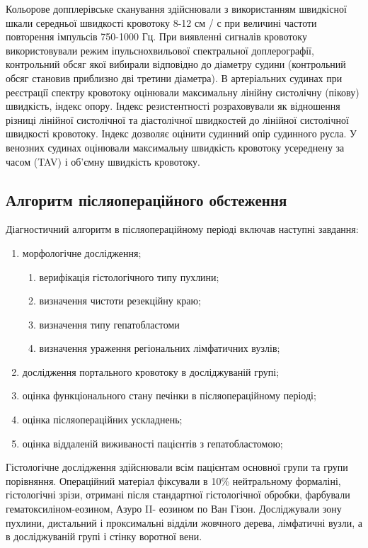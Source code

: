 Кольорове допплерівське сканування здійснювали з використанням швидкісної шкали середньої швидкості кровотоку 8-12 см / с при величині частоти повторення імпульсів 750-1000 Гц. При виявленні сигналів кровотоку використовували режим іпульснохвильової спектральної доплерографії, контрольний обсяг якої вибирали відповідно до діаметру судини (контрольний обсяг становив приблизно дві третини діаметра). В артеріальних судинах при реєстрації спектру кровотоку оцінювали максимальну лінійну систолічну (пікову) швидкість, індекс опору. Індекс резистентності розраховували як відношення різниці лінійної систолічної та діастолічної швидкостей до лінійної систолічної швидкості кровотоку. Індекс дозволяє оцінити судинний опір судинного русла. У венозних судинах оцінювали максимальну швидкість кровотоку усереднену за часом (TAV) і об'ємну швидкість кровотоку.

\subsection{Алгоритм післяопераційного обстеження}

Діагностичний алгоритм в післяопераційному періоді включав наступні завдання:

\begin{enumerate}
    \item морфологічне дослідження;
    \begin{enumerate}
    \item верифікація гістологічного типу пухлини;
    \item визначення чистоти резекційну краю;
    \item визначення типу гепатобластоми
    \item визначення ураження регіональних лімфатичних вузлів;
\end{enumerate}
    \item дослідження портального кровотоку в досліджуваній групі;
    \item оцінка функціонального стану печінки в післяопераційному періоді;
    \item оцінка післяопераційних ускладнень;
    \item оцінка віддаленій виживаності пацієнтів з гепатобластомою;
\end{enumerate}






Гістологічне дослідження здійснювали всім пацієнтам основної групи та групи порівняння. Операційний матеріал фіксували в 10\% нейтральному формаліні, гістологічні зрізи, отримані після стандартної гістологічної обробки, фарбували гематоксиліном-еозином, Азуро II- еозином по Ван Гізон. Досліджували зону пухлини, дистальний і проксимальні відділи жовчного дерева, лімфатичні вузли, а в досліджуваній групі і стінку воротної вени.


